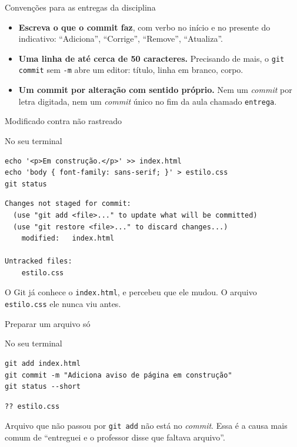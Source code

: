 \documentclass{beamer}
\newenvironment{noterminal}
  {\begin{exampleblock}{No seu terminal}}
  {\end{exampleblock}}
\begin{document}
\begin{frame}{Convenções para as entregas da disciplina}
  \begin{itemize}
    \item \textbf{Escreva o que o commit faz}, com verbo no início e no presente
          do indicativo: ``Adiciona'', ``Corrige'', ``Remove'', ``Atualiza''.
    \item \textbf{Uma linha de até cerca de 50 caracteres.} Precisando de mais,
          o \texttt{git commit} sem \texttt{-m} abre um editor: título, linha em
          branco, corpo.
    \item \textbf{Um commit por alteração com sentido próprio.} Nem um
          \textit{commit} por letra digitada, nem um \textit{commit} único no
          fim da aula chamado \texttt{entrega}.
  \end{itemize}
\end{frame}

\begin{frame}[fragile]{Modificado contra não rastreado}
  \begin{noterminal}
    \begin{verbatim}
echo '<p>Em construção.</p>' >> index.html
echo 'body { font-family: sans-serif; }' > estilo.css
git status
    \end{verbatim}
  \end{noterminal}

  \begin{verbatim}
Changes not staged for commit:
  (use "git add <file>..." to update what will be committed)
  (use "git restore <file>..." to discard changes...)
	modified:   index.html

Untracked files:
	estilo.css
  \end{verbatim}

  O Git já conhece o \texttt{index.html}, e percebeu que ele mudou. O arquivo
  \texttt{estilo.css} ele nunca viu antes.
\end{frame}

\begin{frame}[fragile]{Preparar um arquivo só}
  \begin{noterminal}
    \begin{verbatim}
git add index.html
git commit -m "Adiciona aviso de página em construção"
git status --short
    \end{verbatim}
  \end{noterminal}

  \begin{verbatim}
?? estilo.css
  \end{verbatim}

  \begin{alertblock}{}
    Arquivo que não passou por \texttt{git add} não está no \textit{commit}.
    Essa é a causa mais comum de ``entreguei e o professor disse que faltava
    arquivo''.
  \end{alertblock}
\end{frame}
\end{document}
